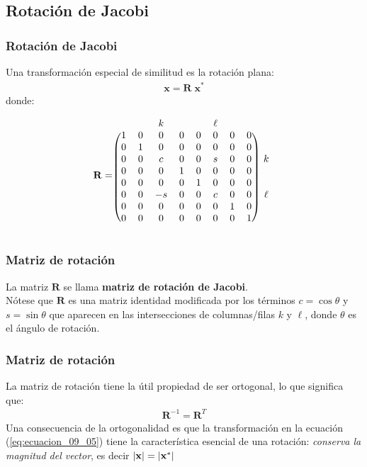 \documentclass[12pt]{beamer}
\begin{document}
\subsection{Rotación de Jacobi}

\begin{frame}
\frametitle{Rotación de Jacobi}
Una transformación especial de similitud es la rotación plana:
\pause
\begin{align}
\mathbf{x} = \mathbf{R \; x}^{*}
\label{eq:ecuacion_09_09}
\end{align}
donde:
\end{frame}
\begin{frame}
\renewcommand{\arraystretch}{1}
\begin{align}
\mathbf{R} = 
\begin{blockarray}{ccccccccc}
 &  & k &  &  & \ell & & \\
\begin{block}{(cccccccc)c}
  1 & 0 & 0  & 0 & 0 & 0 & 0 & 0 &   \\
  0 & 1 & 0  & 0 & 0 & 0 & 0 & 0 &   \\
  0 & 0 & c  & 0 & 0 & s & 0 & 0 & k \\
  0 & 0 & 0  & 1 & 0 & 0 & 0 & 0 &   \\
  0 & 0 & 0  & 0 & 1 & 0 & 0 & 0 &   \\
  0 & 0 & -s & 0 & 0 & c & 0 & 0 & \ell   \\
  0 & 0 & 0  & 0 & 0 & 0 & 1 & 0 &   \\
  0 & 0 & 0  & 0 & 0 & 0 & 0 & 1 &   \\
\end{block}
\end{blockarray}
\label{eq:ecuacion_09_10}
\end{align}
\end{frame}
\begin{frame}
\frametitle{Matriz de rotación}
La matriz $\mathbf{R}$ se llama \textbf{\textcolor{electricindigo}{matriz de rotación de Jacobi}}.
\\
\bigskip
\pause
Nótese que $\mathbf{R}$ es una matriz identidad modificada por los términos $c = \cos \theta$ y $s = \sin \theta$ que aparecen en las intersecciones de columnas/filas $k$ y $\ell$, donde $\theta$ es el ángulo de rotación.
\end{frame}
\begin{frame}
\frametitle{Matriz de rotación}
La matriz de rotación tiene la útil propiedad de ser ortogonal, lo que significa que:
\pause
\begin{align}
\mathbf{R}^{-1} = \mathbf{R}^{T}
\label{eq:ecuacion_09_11}
\end{align}
\pause
Una consecuencia de la ortogonalidad es que la transformación en la ecuación (\ref{eq:ecuacion_09_05}) tiene la característica esencial de una rotación: \pause \emph{conserva la magnitud del vector}, es decir $\abs{ \mathbf{x} } = \abs{ \mathbf{x}^{*} }$
\end{frame}
\end{document}
